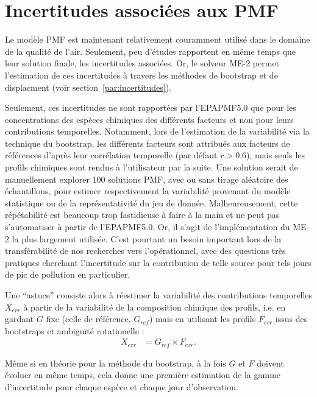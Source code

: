 \section{Incertitudes associées aux PMF}%
\label{sub:incertitudes_associées}

Le modèle PMF est maintenant relativement couramment utilisé dans le domaine de la
qualité de l'air. Seulement, peu d'études rapportent en même temps que leur solution
finale, les incertitudes associées. Or, le solveur ME-2 permet l'estimation de ces
incertitudes à travers les méthodes de bootstrap et de displacment (voir
section~\ref{par:incertitudes}).

Seulement, ces incertitudes ne sont rapportées par l'EPAPMF5.0 que pour les concentrations
des espèces chimiques des différents facteurs et non pour leurs contributions temporelles.
Notamment, lors de l'estimation de la variabilité via la technique du bootstrap, les différents facteurs
sont attribués aux facteurs de références d'après leur corrélation temporelle (par défaut
$r > 0.6$), mais seuls les profils chimiques sont rendus à l'utilisateur par la suite.
Une solution serait de manuellement explorer 100 solutions PMF, avec ou sans tirage
aléatoire des échantillons, pour estimer respectivement la variabilité provenant du modèle
statistique ou de la représentativité du jeu de donnée. Malheureusement, cette
répétabilité est beaucoup trop fastidieuse à faire à la main et ne peut pas s'automatiser à
partir de l'EPAPMF5.0. Or, il s'agit de l'implémentation du ME-2 la plus largement
utilisée. C'est pourtant un besoin important lors de la transférabilité de nos recherches
vers l'opérationnel, avec des questions très pratiques cherchant l'incertitude
sur la contribution de telle source pour tels jours de pic de pollution en particulier.

Une ``astuce'' consiste alors à réestimer la variabilité des contributions temporelles
$X_{err}$ à partir de la variabilité de la composition chimique des profils, i.e. en gardant
$G$ fixe (celle de référence, $G_{ref}$) mais en utilisant les profils $F_{err}$ issus
des bootstraps et ambiguïté rotationelle :
\begin{align}
    \label{eq:hack_unc}
    X_{err} &= G_{ref} \times F_{err}.
\end{align}

Même si en théorie pour la méthode du bootstrap, à la fois $G$ et $F$ doivent
évoluer en même temps, cela donne une première estimation de la gamme d'incertitude pour
chaque espèce et chaque jour d'observation.

